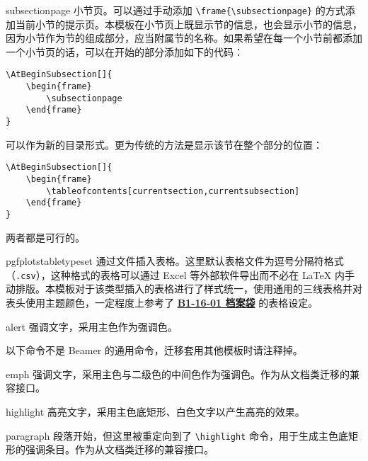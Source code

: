 \documentclass[a4paper,12pt]{article}
\begin{document}
\begin{docCommand*}[]{subsectionpage}{}
    小节页。可以通过手动添加 \verb"\frame{\subsectionpage}" 的方式添加当前小节的提示页。本模板在小节页上既显示节的信息，也会显示小节的信息，因为小节作为节的组成部分，应当附属节的名称。如果希望在每一个小节前都添加一个小节页的话，可以在开始的部分添加如下的代码：
    \begin{verbatim}
\AtBeginSubsection[]{
    \begin{frame}
        \subsectionpage
    \end{frame}
}\end{verbatim}
    可以作为新的目录形式。更为传统的方法是显示该节在整个部分的位置：
    \begin{verbatim}
\AtBeginSubsection[]{
    \begin{frame}
        \tableofcontents[currentsection,currentsubsection]
    \end{frame}
}\end{verbatim}
    两者都是可行的。
\end{docCommand*}

\begin{docCommand*}[]{pgfplotstabletypeset}{}
    通过文件插入表格。这里默认表格文件为逗号分隔符格式（\verb".csv"），这种格式的表格可以通过 Excel 等外部软件导出而不必在 \LaTeX{} 内手动排版。本模板对于该类型插入的表格进行了样式统一，使用通用的三线表格并对表头使用主题颜色，一定程度上参考了 \href{https://vi.sjtu.edu.cn/index.php/articles/app/7}{\textbf{B1-16-01 档案袋}} 的表格设定。
\end{docCommand*}

\begin{docCommand*}[]{alert}{}
    强调文字，采用主色作为强调色。
\end{docCommand*}

以下命令不是 \textsf{Beamer} 的通用命令，迁移套用其他模板时请注释掉。

\begin{docCommand*}[]{emph}{}
    强调文字，采用主色与二级色的中间色作为强调色。作为从文档类迁移的兼容接口。
\end{docCommand*}

\begin{docCommand*}[]{highlight}{}
    高亮文字，采用主色底矩形、白色文字以产生高亮的效果。
\end{docCommand*}

\begin{docCommand*}[]{paragraph}{}
    段落开始，但这里被重定向到了 \verb"\highlight" 命令，用于生成主色底矩形的强调条目。作为从文档类迁移的兼容接口。
\end{docCommand*}
\end{document}
